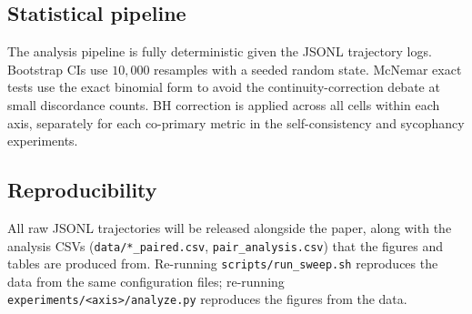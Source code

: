 \subsection{Statistical pipeline}

The analysis pipeline is fully deterministic given the JSONL trajectory
logs. Bootstrap CIs use $10{,}000$ resamples with a seeded random
state. McNemar exact tests use the exact binomial form to avoid the
continuity-correction debate at small discordance counts. BH correction
is applied across all cells within each axis, separately for each
co-primary metric in the self-consistency and sycophancy experiments.

\subsection{Reproducibility}

All raw JSONL trajectories will be released alongside the paper, along
with the analysis CSVs (\texttt{data/*\_paired.csv},
\texttt{pair\_analysis.csv}) that the figures and tables are produced
from. Re-running \texttt{scripts/run\_sweep.sh} reproduces the data
from the same configuration files; re-running
\texttt{experiments/<axis>/analyze.py} reproduces the figures from the
data.
